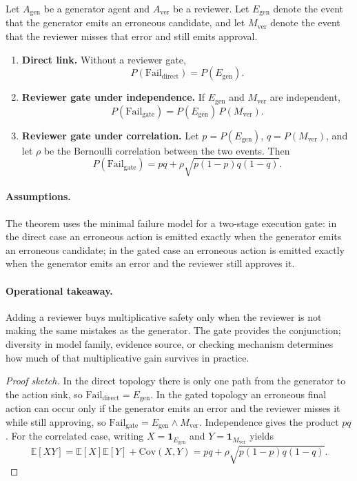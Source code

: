 \begin{theorem}
\label{thm:reviewer-gate}
Let $A_{\mathrm{gen}}$ be a generator agent and $A_{\mathrm{ver}}$ be a reviewer. Let
$E_{\mathrm{gen}}$ denote the event that the generator emits an erroneous candidate, and let
$M_{\mathrm{ver}}$ denote the event that the reviewer misses that error and still emits approval.
\begin{enumerate}[leftmargin=*]
\item[(a)] \textbf{Direct link.} Without a reviewer gate,
\[
P(\mathrm{Fail}_{\mathrm{direct}}) = P(E_{\mathrm{gen}}).
\]
\item[(b)] \textbf{Reviewer gate under independence.} If $E_{\mathrm{gen}}$ and $M_{\mathrm{ver}}$ are independent,
\[
P(\mathrm{Fail}_{\mathrm{gate}}) = P(E_{\mathrm{gen}})\,P(M_{\mathrm{ver}}).
\]
\item[(c)] \textbf{Reviewer gate under correlation.} Let $p = P(E_{\mathrm{gen}})$, $q = P(M_{\mathrm{ver}})$,
and let $\rho$ be the Bernoulli correlation between the two events. Then
\[
P(\mathrm{Fail}_{\mathrm{gate}})
= pq + \rho\sqrt{p(1-p)q(1-q)}.
\]
\end{enumerate}
\end{theorem}

\paragraph{Assumptions.}
The theorem uses the minimal failure model for a two-stage execution gate: in the direct case an
erroneous action is emitted exactly when the generator emits an erroneous candidate; in the gated case an
erroneous action is emitted exactly when the generator emits an error and the reviewer still approves it.

\paragraph{Operational takeaway.}
Adding a reviewer buys multiplicative safety only when the reviewer is not making the same mistakes as
the generator. The gate provides the conjunction; diversity in model family, evidence source, or checking
mechanism determines how much of that multiplicative gain survives in practice.

\begin{proof}[Proof sketch]
In the direct topology there is only one path from the generator to the action sink, so
$\mathrm{Fail}_{\mathrm{direct}} = E_{\mathrm{gen}}$. In the gated topology an erroneous final action can
occur only if the generator emits an error and the reviewer misses it while still approving, so
$\mathrm{Fail}_{\mathrm{gate}} = E_{\mathrm{gen}} \wedge M_{\mathrm{ver}}$. Independence gives the product
$pq$. For the correlated case, writing $X = \mathbf{1}_{E_{\mathrm{gen}}}$ and
$Y = \mathbf{1}_{M_{\mathrm{ver}}}$ yields
\[
\mathbb{E}[XY] = \mathbb{E}[X]\mathbb{E}[Y] + \mathrm{Cov}(X,Y)
= pq + \rho\sqrt{p(1-p)q(1-q)}.
\]
\end{proof}


